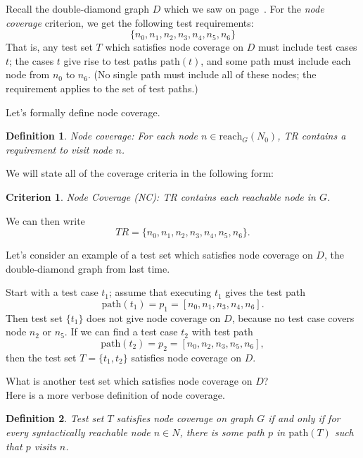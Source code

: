 \documentclass[11pt]{article}
\newtheorem{defn}{Definition}
\newtheorem{crit}{Criterion}
\begin{document}
Recall the double-diamond graph $D$ which we saw on page~\pageref{D}.
For the \emph{node coverage} criterion, we get the following test requirements:
\[ \{ n_0, n_1, n_2, n_3, n_4, n_5, n_6 \} \]
That is, any test set $T$ which satisfies node coverage on $D$ must include
test cases $t$; the cases $t$ give rise to test paths $\mbox{path}(t)$, and
some path must include each node from $n_0$ to $n_6$. (No single path must
include all of these nodes; the requirement applies to the set of
test paths.)

Let's formally define node coverage.
\begin{defn}
Node coverage: For each node $n \in \mbox{reach}_G(N_0)$, \emph{TR} contains
a requirement to visit node $n$.
\end{defn}

We will state all of the coverage criteria in the following form:
\begin{crit}
Node Coverage (NC): \emph{TR} contains each reachable node in $G$.
\end{crit}

We can then write
\[ \mathit{TR} = \{ n_0, n_1, n_2, n_3, n_4, n_5, n_6\}. \]

Let's consider an example of a test set which satisfies node coverage
on $D$, the double-diamond graph from last time.

Start with a test case $t_1$; assume that executing $t_1$ gives the
test path 
\[ \mbox{path}(t_1) = p_1 = [n_0, n_1, n_3, n_4, n_6].\] 
Then
test set $\{ t_1\}$ does not give node coverage on $D$, because no
test case covers node $n_2$ or $n_5$. If we can find a test case $t_2$
with test path 
\[\mbox{path}(t_2) = p_2 = [n_0, n_2, n_3, n_5, n_6],\]
then the test set $T = \{ t_1, t_2 \}$ satisfies node coverage on $D$.

{\sf What is another test set which satisfies node coverage on $D$?}\\[2em]


Here is a more verbose definition of node coverage.

\begin{defn}
Test set $T$ satisfies \emph{node coverage} on graph $G$ if and only
if for every syntactically reachable node $n \in N$, there is some
path $p$ in $\mbox{path}(T)$ such that $p$ visits $n$.
\end{defn}
\end{document}
